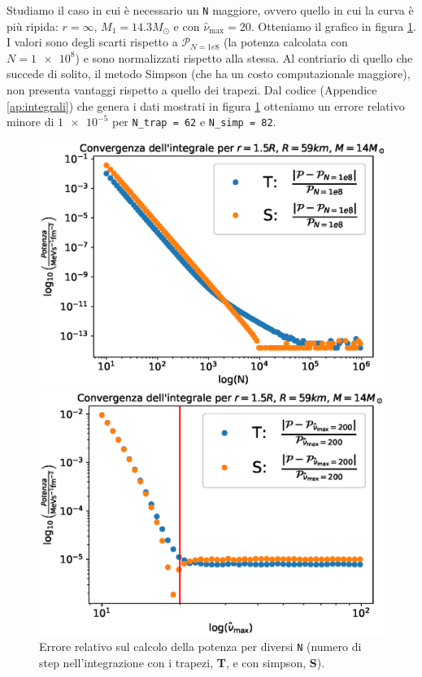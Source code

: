 \documentclass[a4paper, titlepage]{article}
\begin{document}
Studiamo il caso in cui è necessario un \texttt{N} maggiore, ovvero quello in cui la curva è più ripida: $r = \infty$, $M_1 = 14.3M_\odot$ e con $\hat \nu_\text{max} = 20$.
Otteniamo il grafico in figura \ref{fig:Pot_cvgN}.
I valori sono degli scarti rispetto a $\mathcal{P}_{N = 1e8}$ (la potenza calcolata con $N = \num{1e8}$) e sono normalizzati rispetto alla stessa.
Al contriario di quello che succede di solito, il metodo Simpson (che ha un costo computazionale maggiore), non presenta vantaggi rispetto a quello dei trapezi. Dal codice (Appendice \ref{ap:integrali}) che genera i dati mostrati in figura \ref{fig:Pot_cvgN} otteniamo un errore relativo minore di $\num{1e-5}$ per \texttt{N\_trap = 62} e \texttt{N\_simp = 82}.
\begin{figure}[h]
    \begin{minipage}{0.49 \textwidth}
        \centering
        \includegraphics[width = \textwidth]{Figures/Pot_cvgN.eps}
        \caption{Errore relativo sul calcolo della potenza per diversi \texttt{N} (numero di step nell'integrazione con i trapezi, \textbf{T}, e con simpson, \textbf{S}). \\ \\}
        \label{fig:Pot_cvgN}
    \end{minipage}
    \hspace{0.01 \textwidth}
    \begin{minipage}{0.49 \textwidth}
        \centering
        \includegraphics[width = \textwidth]{Figures/Pot_cvgA.eps}

\end{minipage}
\end{figure}
\end{document}
